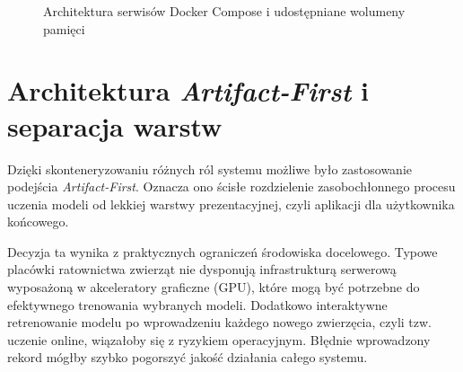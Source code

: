 \begin{figure}[htbp]
\centering
{}
\caption{Architektura serwisów Docker Compose i udostępniane wolumeny pamięci}
\label{fig:docker_compose_arch}
\end{figure}

\section{Architektura \emph{Artifact-First} i separacja warstw}
\label{sec:artifact-first-separacja-warstw}

Dzięki skonteneryzowaniu różnych ról systemu możliwe było zastosowanie podejścia \emph{Artifact-First}. Oznacza ono ścisłe rozdzielenie zasobochłonnego procesu uczenia modeli od lekkiej warstwy prezentacyjnej, czyli aplikacji dla użytkownika końcowego.

Decyzja ta wynika z praktycznych ograniczeń środowiska docelowego. Typowe placówki ratownictwa zwierząt nie dysponują infrastrukturą serwerową wyposażoną w akceleratory graficzne (GPU), które mogą być potrzebne do efektywnego trenowania wybranych modeli. Dodatkowo interaktywne retrenowanie modelu po wprowadzeniu każdego nowego zwierzęcia, czyli tzw. uczenie online, wiązałoby się z ryzykiem operacyjnym. Błędnie wprowadzony rekord mógłby szybko pogorszyć jakość działania całego systemu.

